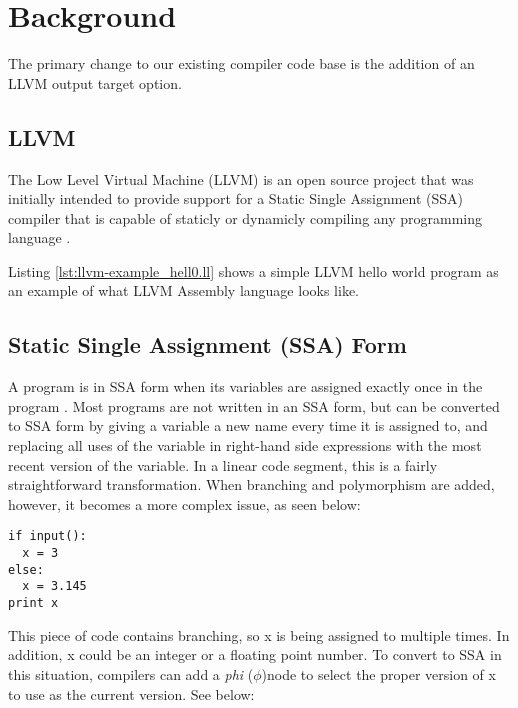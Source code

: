 \documentclass[11pt]{article}
\begin{document}
\section{Background}

The primary change to our existing compiler code base is the addition
of an LLVM output target option.

\subsection{LLVM}

The Low Level Virtual Machine (LLVM) is an open source project that
was initially intended to provide support for a Static Single
Assignment (SSA) compiler that is capable of staticly or dynamicly
compiling any programming language \cite{llvm.org}.

Listing \ref{lst:llvm-example_hell0.ll} shows
a simple LLVM hello world program as an example of
what LLVM Assembly language looks like.



\subsection{Static Single Assignment (SSA) Form}

A program is in SSA form when its variables are assigned exactly once
in the program \cite{gcc-gnu.org}. Most programs are not written in an
SSA form, but can be converted to SSA form by giving a variable a new
name every time it is assigned to, and replacing all uses of the
variable in right-hand side expressions with the most recent version
of the variable. In a linear code segment, this is a fairly
straightforward transformation. When branching and polymorphism are
added, however, it becomes a more complex issue, as seen below:

\begin{verbatim}
if input():
  x = 3
else:
  x = 3.145
print x
\end{verbatim}

This piece of code contains branching, so x is being assigned to
multiple times. In addition, x could be an integer or a floating point
number. To convert to SSA in this situation, compilers can add a
\emph{phi} ($\phi$)node to select the proper version of x to use as
the current version. See below:
\end{document}
